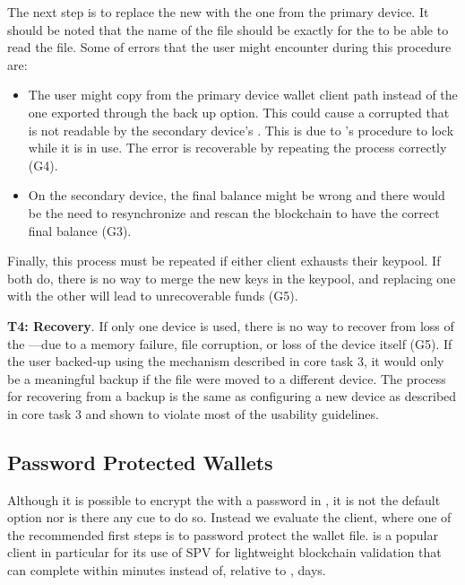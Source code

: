 The next step is to replace the new \walletfile with the one from the primary device. It should be noted that the name of the file should be exactly \walletfile for the \bitcoinclient to be able to read the file. Some of errors that the user might encounter during this procedure are:
\begin{itemize}
	\item The user might copy \walletfile from the primary device wallet client path instead of the one exported through the back up option. This could cause a corrupted \walletfile that is not readable by the secondary device's \bitcoinclient. This is due to \bitcoinclient's procedure to lock \walletfile while it is in use. The error is recoverable by repeating the process correctly (G4). 
	\item On the secondary device, the final balance might be wrong and there would be the need to resynchronize and rescan the blockchain to have the correct final balance (G3).
\end{itemize}

Finally, this process must be repeated if either client exhausts their keypool. If both do, there is no way to merge the new keys in the keypool, and replacing one \walletfile with the other will lead to unrecoverable funds (G5). 

\textbf{T4: Recovery}.
If only one device is used, there is no way to recover from loss of the \walletfile---\eg due to a memory failure, file corruption, or loss of the device itself (G5). If the user backed-up \walletfile using the mechanism described in core task 3, it would only be a meaningful backup if the file were moved to a different device. The process for recovering from a backup is the same as configuring a new device as described in core task 3 and shown to violate most of the usability guidelines.


\subsection{Password Protected Wallets}
Although it is possible to encrypt the \walletfile with a password in \bitcoinclient, it is not the default option nor is there any cue to do so. Instead we evaluate the \multibit client, where one of the recommended first steps is to password protect the wallet file. \multibit is a popular client in particular for its use of SPV for lightweight blockchain validation that can complete within minutes instead of, relative to \bitcoinclient, days.

